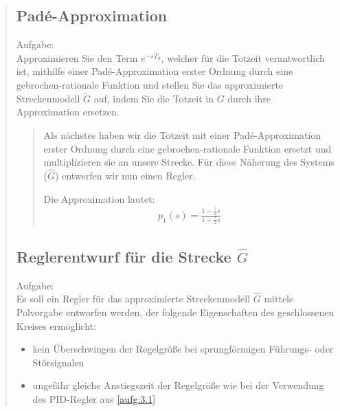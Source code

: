 \begin{quote}
    
    \subsection{Pad\'e-Approximation}
    
    Aufgabe:\\
    Approximieren Sie den Term $e^{-sT_d}$, welcher für die Totzeit verantwortlich ist, mithilfe einer
    Pad\'e-Approximation erster Ordnung durch eine gebrochen-rationale Funktion und stellen Sie das approximierte
    Streckenmodell $\tilde{G}$ auf, indem Sie die Totzeit in $G$ durch ihre Approximation ersetzen. \vspace{1em}
    
    \begin{quote}
        
        Als nächstes haben wir die Totzeit mit einer Pad\'e-Approximation erster Ordnung durch eine gebrochen-rationale
        Funktion ersetzt und multiplizieren sie an unsere Strecke. Für diese Näherung des Systems ($\hat{G}$) entwerfen
        wir nun einen Regler.\vspace{1em}
        
        Die Approximation lautet:
        \begin{equation*}
        	\begin{split}
        		p_1(s) = \frac{1-\frac{\tau}{2}s}{1+\frac{\tau}{2}s}
        	\end{split}
        \end{equation*}
        
    \end{quote}
    
    \subsection{Reglerentwurf für die Strecke $\hat{G}$}
    Aufgabe:\\
    Es soll ein Regler für das approximierte Streckenmodell $\hat{G}$ mittels Polvorgabe entworfen werden, der
    folgende Eigenschaften des geschlossenen Kreises ermöglicht:
        
        
        \begin{itemize}
            
            \item kein Überschwingen der Regelgröße bei sprungförmigen Führungs- oder Störsignalen
            
            \item ungefähr gleiche Anstiegszeit der Regelgröße wie bei der Verwendung des PID-Regler aus \ref{aufg:3.1}
            

\end{itemize}
\end{quote}
